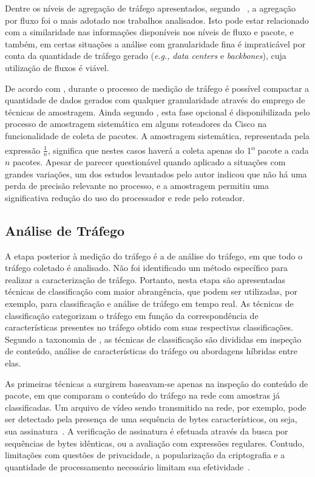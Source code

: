 Dentre os níveis de agregação de tráfego apresentados, segundo ~, a agregação por fluxo foi o mais adotado nos trabalhos analisados.
%
Isto pode estar relacionado com a similaridade nas informações disponíveis nos níveis de fluxo e pacote, e também, em certas situações a análise com granularidade fina é impraticável por conta da quantidade de tráfego gerado (\textit{e.g.,} \textit{data centers} e \textit{backbones}), cuja utilização de fluxos é viável.

De acordo com , durante o processo de medição de tráfego é possível compactar a quantidade de dados gerados com qualquer granularidade através do emprego de técnicas de amostragem.
%
Ainda segundo , esta fase opcional é disponibilizada pelo processo de amostragem sistemática em alguns roteadores da Cisco na funcionalidade de coleta de pacotes.
%
A amostragem sistemática, representada pela expressão $\frac{1}{n}$, significa que nestes casos haverá a coleta apenas do 1\textsuperscript{o} pacote a cada $n$ pacotes.
%
Apesar de parecer questionável quando aplicado a situações com grandes variações, um dos estudos levantados pelo autor indicou que não há uma perda de precisão relevante no processo, e a amostragem permitiu uma significativa redução do uso do processador e rede pelo roteador.

\subsection{Análise de Tráfego}

A etapa posterior à medição do tráfego é a de análise do tráfego, em que todo o tráfego coletado é analisado.
%
Não foi identificado um método específico para realizar a caracterização de tráfego.
%
Portanto, nesta etapa são apresentadas técnicas de classificação com maior abrangência, que podem ser utilizadas, por exemplo, para classificação e análise de tráfego em tempo real.
%
As técnicas de classificação categorizam o tráfego em função da correspondência de características presentes no tráfego obtido com suas respectivas classificações. 
%
Segundo a taxonomia de , as técnicas de classificação são divididas em inspeção de conteúdo, análise de características do tráfego ou abordagens híbridas entre elas.

As primeiras técnicas a surgirem baseavam-se apenas na inspeção do conteúdo de pacote, em que comparam o conteúdo do tráfego na rede com amostras já classificadas. 
%
Um arquivo de vídeo sendo transmitido na rede, por exemplo, pode ser detectado pela presença de uma sequência de bytes característicos, ou seja, sua assinatura~\cite{dharmapurikar:2003:bloomfilters}. 
%
A verificação de assinatura é efetuada através da busca por sequências de bytes idênticas, ou a avaliação com expressões regulares.
%
Contudo, limitações com questões de privacidade, a popularização da criptografia e a quantidade de processamento necessário limitam sua efetividade~\cite{park:2011:finegrained}.

